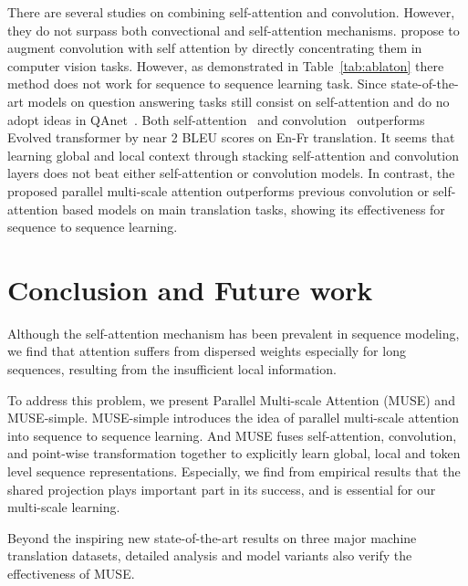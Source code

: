\documentclass{article} \usepackage{iclr2020_conference,times}
\begin{document}
There are several studies on combining self-attention and convolution. However, they do not surpass both convectional and self-attention mechanisms.  \citet{sukhbaatar2019augmenting} propose to augment convolution with self attention by directly concentrating them in computer vision tasks.  However, as demonstrated in Table~\ref{tab:ablaton} there method does not work for sequence to sequence learning task. Since state-of-the-art models on question answering tasks still consist on self-attention and do no adopt ideas in QAnet~\citep{yu2018qanet}. Both self-attention~\citep{ott2018scaling} and convolution~\citep{wu2019pay} outperforms Evolved transformer by near 2 BLEU scores on En-Fr translation. It seems that learning global and local context through stacking self-attention and convolution  layers does not beat either self-attention or convolution models. In contrast, the proposed parallel multi-scale attention outperforms  previous convolution or self-attention  based models  on main translation tasks, showing its effectiveness for sequence to sequence learning.









\section{Conclusion and Future work}


Although the self-attention mechanism has been prevalent in sequence modeling, we find that attention suffers from dispersed weights especially for long sequences, resulting from the insufficient local information. 

To address this problem, we present Parallel Multi-scale Attention (MUSE) and MUSE-simple.  MUSE-simple introduces the idea of parallel multi-scale attention into sequence to sequence learning. And MUSE fuses self-attention, convolution, and point-wise transformation together to explicitly learn global, local and token level sequence representations. 
Especially, we find from empirical results that the shared projection plays important part in its success, and is essential for our multi-scale learning.

Beyond the inspiring new state-of-the-art results on three major machine translation datasets, detailed  analysis and model variants also verify the effectiveness of MUSE. 
\end{document}
